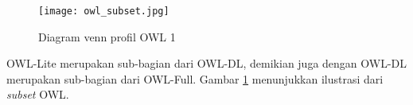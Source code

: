 \begin{figure}[ht]
	\centering
	\texttt{[image: owl\_subset.jpg]}
	\caption{Diagram venn profil OWL 1}
	\label{fig:owl_subset}
\end{figure}

OWL-Lite merupakan sub-bagian dari OWL-DL, demikian juga dengan OWL-DL merupakan sub-bagian dari OWL-Full. Gambar \ref{fig:owl_subset} menunjukkan ilustrasi dari \emph{subset} OWL.

